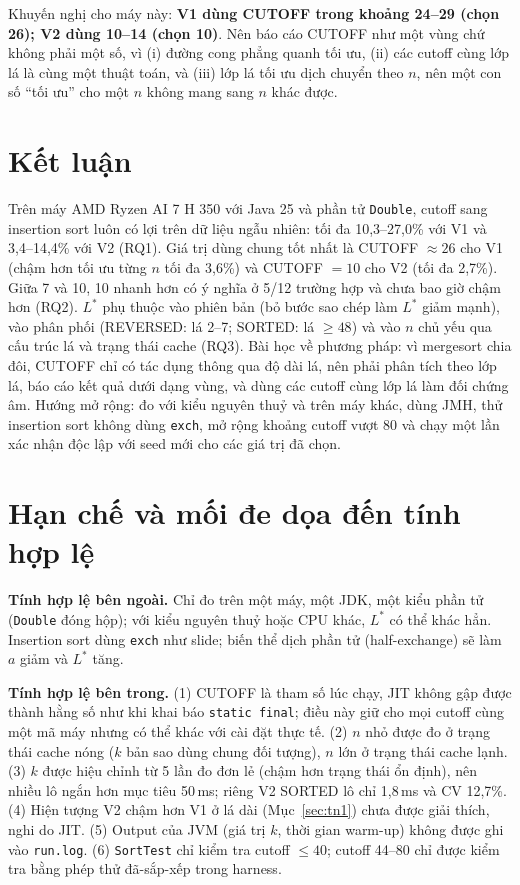 \documentclass[11pt,a4paper]{article}
\begin{document}
Khuyến nghị cho máy này: \textbf{V1 dùng CUTOFF trong khoảng 24--29 (chọn 26); V2 dùng 10--14 (chọn 10)}. Nên báo cáo
CUTOFF như một vùng chứ không phải một số, vì (i) đường cong phẳng quanh tối ưu, (ii) các cutoff cùng lớp lá là cùng một thuật
toán, và (iii) lớp lá tối ưu dịch chuyển theo $n$, nên một con số ``tối ưu'' cho một $n$ không mang sang $n$ khác được.

\section{Kết luận}\label{sec:conclusion}
Trên máy AMD Ryzen AI 7 H 350 với Java 25 và phần tử \texttt{Double}, cutoff sang insertion sort luôn có lợi trên dữ liệu ngẫu nhiên:
tối đa 10,3--27,0\% với V1 và 3,4--14,4\% với V2 (RQ1). Giá trị dùng chung tốt nhất là CUTOFF $\approx 26$ cho V1 (chậm hơn tối ưu
từng $n$ tối đa 3,6\%) và CUTOFF $=10$ cho V2 (tối đa 2,7\%). Giữa 7 và 10, 10 nhanh hơn có ý nghĩa ở 5/12 trường hợp và chưa bao giờ
chậm hơn (RQ2). $L^*$ phụ thuộc vào phiên bản (bỏ bước sao chép làm $L^*$ giảm mạnh), vào phân phối (REVERSED: lá 2--7;
SORTED: lá $\ge 48$) và vào $n$ chủ yếu qua cấu trúc lá và trạng thái cache (RQ3). Bài học về phương pháp: vì mergesort chia đôi,
CUTOFF chỉ có tác dụng thông qua độ dài lá, nên phải phân tích theo lớp lá, báo cáo kết quả dưới dạng vùng, và dùng các cutoff
cùng lớp lá làm đối chứng âm. Hướng mở rộng: đo với kiểu nguyên thuỷ và trên máy khác, dùng JMH, thử insertion sort không dùng
\texttt{exch}, mở rộng khoảng cutoff vượt 80 và chạy một lần xác nhận độc lập với seed mới cho các giá trị đã chọn.

\section{Hạn chế và mối đe dọa đến tính hợp lệ}\label{sec:limits}
\textbf{Tính hợp lệ bên ngoài.} Chỉ đo trên một máy, một JDK, một kiểu phần tử (\texttt{Double} đóng hộp); với kiểu nguyên thuỷ
hoặc CPU khác, $L^*$ có thể khác hẳn. Insertion sort dùng \texttt{exch} như slide; biến thể dịch phần tử (half-exchange) sẽ làm
$a$ giảm và $L^*$ tăng.

\textbf{Tính hợp lệ bên trong.}
(1) CUTOFF là tham số lúc chạy, JIT không gập được thành hằng số như khi khai báo \texttt{static final}; điều này giữ cho mọi
cutoff cùng một mã máy nhưng có thể khác với cài đặt thực tế.
(2) $n$ nhỏ được đo ở trạng thái cache nóng ($k$ bản sao dùng chung đối tượng), $n$ lớn ở trạng thái cache lạnh.
(3) $k$ được hiệu chỉnh từ 5 lần đo đơn lẻ (chậm hơn trạng thái ổn định), nên nhiều lô ngắn hơn mục tiêu 50\,ms; riêng V2 SORTED
lô chỉ 1,8\,ms và CV 12,7\%.
(4) Hiện tượng V2 chậm hơn V1 ở lá dài (Mục~\ref{sec:tn1}) chưa được giải thích, nghi do JIT.
(5) Output của JVM (giá trị $k$, thời gian warm-up) không được ghi vào \texttt{run.log}.
(6) \texttt{SortTest} chỉ kiểm tra cutoff $\le 40$; cutoff 44--80 chỉ được kiểm tra bằng phép thử đã-sắp-xếp trong harness.
\end{document}
